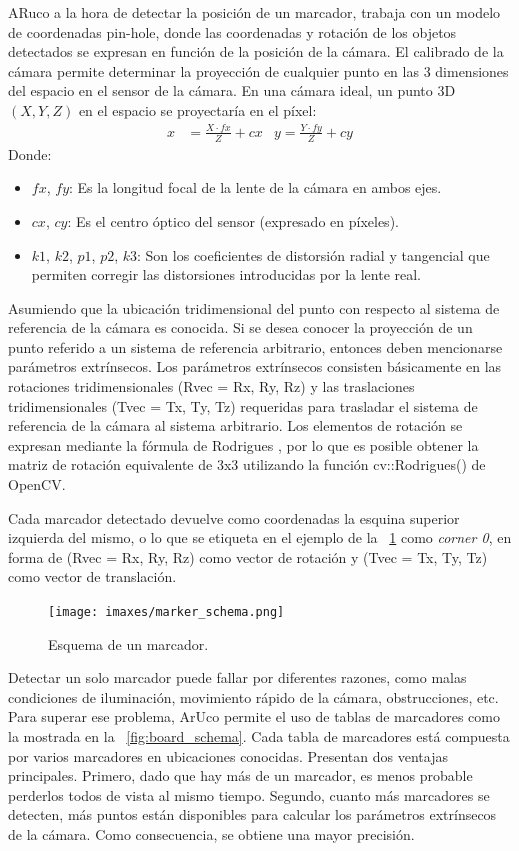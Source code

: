 ARuco a la hora de detectar la posición de un marcador, trabaja con un modelo de coordenadas pin-hole, donde las coordenadas y rotación de los objetos detectados se expresan en función de la posición de la cámara.
El calibrado de la cámara permite determinar la proyección de cualquier punto en las 3 dimensiones del espacio en el sensor de la cámara. En una cámara ideal, un punto 3D $(X, Y, Z)$ en el espacio se proyectaría en el píxel:
\begin{align*}
	x & = \frac{X \cdot fx}{Z} + cx & y = \frac{Y \cdot fy}{Z} + cy
\end{align*}
Donde:
\begin{itemize}
	\item $fx$, $fy$: Es la longitud focal de la lente de la cámara en ambos ejes.
	\item $cx$, $cy$: Es el centro óptico del sensor (expresado en píxeles).
	\item $k1$, $k2$, $p1$, $p2$, $k3$: Son los coeficientes de distorsión radial y tangencial que permiten corregir las distorsiones introducidas por la lente real.
\end{itemize}
Asumiendo que la ubicación tridimensional del punto con respecto al sistema de referencia de la cámara es conocida. Si se desea conocer la proyección de un punto referido a un sistema de referencia arbitrario, entonces deben mencionarse parámetros extrínsecos. Los parámetros extrínsecos consisten básicamente en las rotaciones tridimensionales (Rvec = {Rx, Ry, Rz}) y las traslaciones tridimensionales (Tvec = {Tx, Ty, Tz}) requeridas para trasladar el sistema de referencia de la cámara al sistema arbitrario. Los elementos de rotación se expresan mediante la fórmula de Rodrigues \cite{mebius2007derivation}, por lo que es posible obtener la matriz de rotación equivalente de 3x3 utilizando la función cv::Rodrigues() de OpenCV.

Cada marcador detectado devuelve como coordenadas la esquina superior izquierda del mismo, o lo que se etiqueta en el ejemplo de la \figurename~\ref{fig:marker_schema} como \emph{corner 0}, en forma de (Rvec = {Rx, Ry, Rz}) como vector de rotación y (Tvec = {Tx, Ty, Tz}) como vector de translación.

\begin{figure}
	\centering
	\texttt{[image: imaxes/marker\_schema.png]}
	\caption{Esquema de un marcador.}
	\label{fig:marker_schema}
\end{figure}

Detectar un solo marcador puede fallar por diferentes razones, como malas condiciones de iluminación, movimiento rápido de la cámara, obstrucciones, etc. Para superar ese problema, ArUco permite el uso de tablas de marcadores como la mostrada en la \figurename~\ref{fig:board_schema}. Cada tabla de marcadores está compuesta por varios marcadores en ubicaciones conocidas. Presentan dos ventajas principales. Primero, dado que hay más de un marcador, es menos probable perderlos todos de vista al mismo tiempo. Segundo, cuanto más marcadores se detecten, más puntos están disponibles para calcular los parámetros extrínsecos de la cámara. Como consecuencia, se obtiene una mayor precisión.

